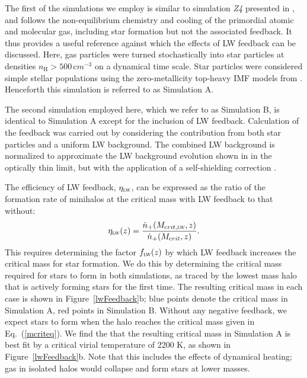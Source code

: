 \documentclass{thesis}
\newcommand{\RefFig}[1]{\mbox{Figure~\ref{#1}}}
\newcommand{\RefEq}[1]{\mbox{Eq.~(\ref{#1})}}
\begin{document}
The first of the simulations we employ is similar to simulation \textit{Z4} 
presented in \citet{PawlikMilosavljevicBromm2011}, and follows
the non-equilibrium chemistry and cooling of the primordial atomic and
molecular gas, including star formation but not the associated
feedback.  It thus provides a useful reference against which the
effects of LW feedback can be discussed. Here, gas particles were
turned stochastically into star particles at densities $n_{\mathrm H} >
500 \,{\mathrm cm}^{-3}$ on a dynamical time scale. Star particles were
considered simple stellar populations using the zero-metallicity
top-heavy IMF models from \citet{Schaerer2003}.  Henceforth this
simulation is referred to as Simulation A.

The second simulation employed here, which we refer to as Simulation
B, is identical to Simulation A except for the inclusion of LW
feedback.  Calculation of the feedback was carried out by considering
the contribution from both star particles and a uniform LW background.
The combined LW background is normalized to approximate the LW
background evolution shown in \citet{GreifBromm2006} in the optically
thin limit, but with the application of a self-shielding correction
\citep{Wolcott-GreenHaimanBryan2011}.


The efficiency of LW feedback, $\eta_{\textsc{lw}}$, can be expressed
as the ratio of the formation rate of minihalos at the critical mass
with LW feedback to that without:
\begin{equation}
  \eta_{\textsc{lw}}(z) = \frac{ \dot{n}_{+}(M_{\mathrm crit, \textsc{lw}},
    z) }{ \dot{n}_{+}(M_{\mathrm crit}, z)}.
\end{equation}
This requires determining the factor $f_{\textsc{lw}}(z)$ by which LW
feedback increases the critical mass for star formation.  We do this
by determining the critical mass required for stars to form in both
simulations, as traced by the lowest mass halo that is actively
forming stars for the first time.  The resulting critical mass in each
case is shown in \RefFig{lwFeedback}b; blue points denote the critical
mass in Simulation A, red points in Simulation B.  Without any
negative feedback, we expect stars to form when the halo reaches the
critical mass given in \RefEq{mcriteq}.  We find the that the resulting critical
mass in Simulation A is best fit by a critical virial temperature of
2200 K, as shown in \RefFig{lwFeedback}b.  Note that this includes the
effects of dynamical heating; gas in isolated halos would collapse and
form stars at lower masses.
\end{document}
